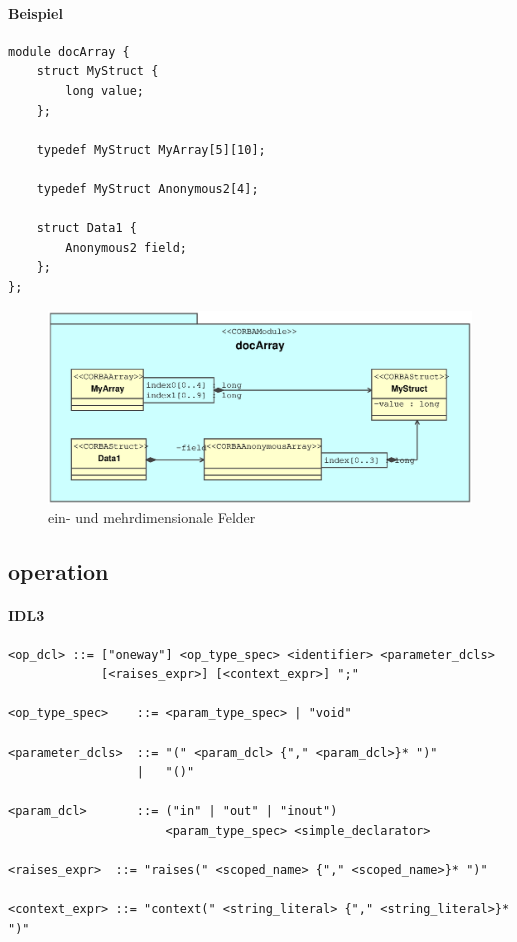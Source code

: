 \documentclass [a4paper,10pt] {scrartcl}
\begin{document}
\paragraph{Beispiel}
\begin{verbatim}
module docArray {
    struct MyStruct {
        long value;
    };

    typedef MyStruct MyArray[5][10];

    typedef MyStruct Anonymous2[4];

    struct Data1 {
        Anonymous2 field;
    };
};
\end{verbatim}
\begin{figure}[!h]
\centerline{\includegraphics[width=1.2\linewidth]{docArray.eps}}
\caption{ein- und mehrdimensionale Felder}
\label{fig:array}
\end{figure}

\cleardoublepage
\subsection{operation}
\paragraph{IDL3}
\begin{verbatim}
<op_dcl> ::= ["oneway"] <op_type_spec> <identifier> <parameter_dcls>
             [<raises_expr>] [<context_expr>] ";"

<op_type_spec>    ::= <param_type_spec> | "void"

<parameter_dcls>  ::= "(" <param_dcl> {"," <param_dcl>}* ")"
                  |   "()"

<param_dcl>       ::= ("in" | "out" | "inout")
                      <param_type_spec> <simple_declarator>

<raises_expr>  ::= "raises(" <scoped_name> {"," <scoped_name>}* ")"

<context_expr> ::= "context(" <string_literal> {"," <string_literal>}* ")"
\end{verbatim}
\end{document}
